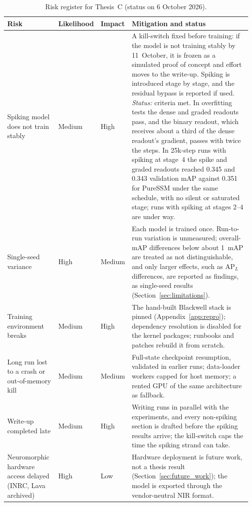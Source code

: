 \documentclass[11pt, a4paper]{report}
\begin{document}
\begin{table}[htbp]
    \centering
    \small
    \caption{Risk register for Thesis~C (status on 6 October 2026).}
    \label{tab:risk_assessment}
    \renewcommand{\arraystretch}{1.4}
    \begin{tabularx}{\textwidth}{|>{\RaggedRight\arraybackslash}p{3.2cm}|l|l|>{\RaggedRight\arraybackslash}X|}
        \hline
        \rowcolor[gray]{0.9} \textbf{Risk} & \textbf{Likelihood} & \textbf{Impact} & \textbf{Mitigation and status} \\ \hline
        Spiking model does not train stably & Medium & High & A kill-switch fixed before training: if the model is not training stably by 11~October, it is frozen as a simulated proof of concept and effort moves to the write-up. Spiking is introduced stage by stage, and the residual bypass is reported if used. \emph{Status:} criteria met. In overfitting tests the dense and graded readouts pass, and the binary readout, which receives about a third of the dense readout's gradient, passes with twice the steps. In 25k-step runs with spiking at stage~4 the spike and graded readouts reached 0.345 and 0.343 validation mAP against 0.351 for PureSSM under the same schedule, with no silent or saturated stage; runs with spiking at stages 2--4 are under way. \\ \hline
        Single-seed variance & High & Medium & Each model is trained once. Run-to-run variation is unmeasured; overall-mAP differences below about 1~mAP are treated as not distinguishable, and only larger effects, such as $\mathrm{AP}_L$ differences, are reported as findings, as single-seed results (Section~\ref{sec:limitations}). \\ \hline
        Training environment breaks & Medium & High & The hand-built Blackwell stack is pinned (Appendix~\ref{app:repro}); dependency resolution is disabled for the kernel packages; runbooks and patches rebuild it from scratch. \\ \hline
        Long run lost to a crash or out-of-memory kill & Medium & Medium & Full-state checkpoint resumption, validated in earlier runs; data-loader workers capped for host memory; a rented GPU of the same architecture as fallback. \\ \hline
        Write-up completed late & Medium & High & Writing runs in parallel with the experiments, and every non-spiking section is drafted before the spiking results arrive; the kill-switch caps the time the spiking strand can take. \\ \hline
        Neuromorphic hardware access delayed (INRC, Lava archived) & High & Low & Hardware deployment is future work, not a thesis result (Section~\ref{sec:future_work}); the model is exported through the vendor-neutral NIR format. \\ \hline
    \end{tabularx}
\end{table}




\end{document}
